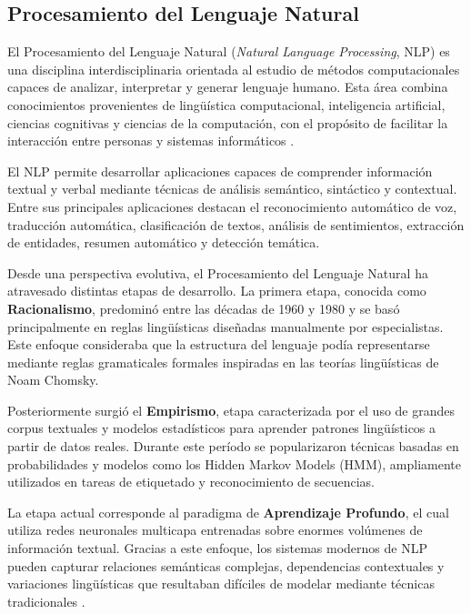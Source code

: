 \subsection{Procesamiento del Lenguaje Natural}

El Procesamiento del Lenguaje Natural (\textit{Natural Language Processing}, NLP) es una disciplina interdisciplinaria orientada al estudio de métodos computacionales capaces de analizar, interpretar y generar lenguaje humano. Esta área combina conocimientos provenientes de lingüística computacional, inteligencia artificial, ciencias cognitivas y ciencias de la computación, con el propósito de facilitar la interacción entre personas y sistemas informáticos \parencite{bk_deng2018deeplearningnlp}.

El NLP permite desarrollar aplicaciones capaces de comprender información textual y verbal mediante técnicas de análisis semántico, sintáctico y contextual. Entre sus principales aplicaciones destacan el reconocimiento automático de voz, traducción automática, clasificación de textos, análisis de sentimientos, extracción de entidades, resumen automático y detección temática.

Desde una perspectiva evolutiva, el Procesamiento del Lenguaje Natural ha atravesado distintas etapas de desarrollo. La primera etapa, conocida como \textbf{Racionalismo}, predominó entre las décadas de 1960 y 1980 y se basó principalmente en reglas lingüísticas diseñadas manualmente por especialistas. Este enfoque consideraba que la estructura del lenguaje podía representarse mediante reglas gramaticales formales inspiradas en las teorías lingüísticas de Noam Chomsky.

Posteriormente surgió el \textbf{Empirismo}, etapa caracterizada por el uso de grandes corpus textuales y modelos estadísticos para aprender patrones lingüísticos a partir de datos reales. Durante este período se popularizaron técnicas basadas en probabilidades y modelos como los Hidden Markov Models (HMM), ampliamente utilizados en tareas de etiquetado y reconocimiento de secuencias.

La etapa actual corresponde al paradigma de \textbf{Aprendizaje Profundo}, el cual utiliza redes neuronales multicapa entrenadas sobre enormes volúmenes de información textual. Gracias a este enfoque, los sistemas modernos de NLP pueden capturar relaciones semánticas complejas, dependencias contextuales y variaciones lingüísticas que resultaban difíciles de modelar mediante técnicas tradicionales \parencite{bk_deng2018deeplearningnlp}.


